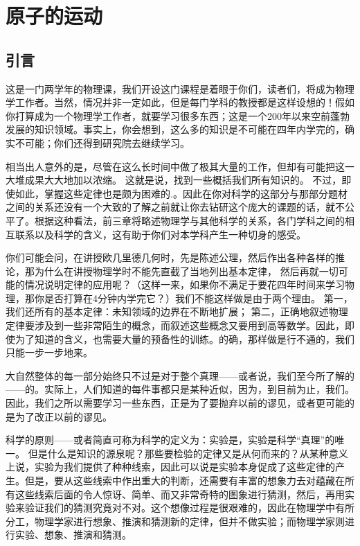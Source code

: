 \chapter{原子的运动}

\section{引言}

这是一门两学年的物理课，我们开设这门课程是着眼于你们，读者们，将成为物理学工作者。当然，情况并非一定如此，但是每门学科的教授都是这样设想的！假如你打算成为一个物理学工作者，就要学习很多东西；这是一个200年以来空前蓬勃发展的知识领域。事实上，你会想到，这么多的知识是不可能在四年内学完的，确实不可能；你们还得到研究院去继续学习。

相当出人意外的是，尽管在这么长时间中做了极其大量的工作，但却有可能把这一大堆成果大大地加以浓缩。 这就是说，找到一些概括我们所有知识的。 不过，即使如此，掌握这些定律也是颇为困难的.。因此在你对科学的这部分与那部分题材之间的关系还没有一个大致的了解之前就让你去钻研这个庞大的课题的话，就不公平了。根据这种看法，前三章将略述物理学与其他科学的关系，各门学科之间的相互联系以及科学的含义，这有助于你们对本学科产生一种切身的感受。

你们可能会问，在讲授欧几里德几何时，先是陈述公理，然后作出各种各样的推论，那为什么在讲授物理学时不能先直截了当地列出基本定律， 然后再就一切可能的情况说明定律的应用呢？（这样一来，如果你不满足于要花四年时间来学习物理，那你是否打算在4分钟内学完它？）我们不能这样做是由于两个理由。 第一，我们还所有的基本定律：未知领域的边界在不断地扩展； 第二，正确地叙述物理定律要涉及到一些非常陌生的概念，而叙述这些概念又要用到高等数学。因此，即使为了知道的含义，也需要大量的预备性的训练。的确，那样做是行不通的，我们只能一步一步地来。

大自然整体的每一部分始终只不过是对于整个真理——或者说，我们至今所了解的——的。实际上，人们知道的每件事都只是某种近似，因为，到目前为止，我们。因此，我们之所以需要学习一些东西，正是为了要抛弃以前的谬见，或者更可能的是为了改正以前的谬见。

科学的原则——或者简直可称为科学的定义为：实验是，实验是科学“真理”的唯一。 但是什么是知识的源泉呢？那些要检验的定律又是从何而来的？从某种意义上说，实验为我们提供了种种线索，因此可以说是实验本身促成了这些定律的产生。但是，要从这些线索中作出重大的判断，还需要有丰富的想象力去对蕴藏在所有这些线索后面的令人惊讶、简单、而又非常奇特的图象进行猜测，然后，再用实验来验证我们的猜测究竟对不对。这个想像过程是很艰难的，因此在物理学中有所分工，物理学家进行想象、推演和猜测新的定律，但并不做实验；而物理学家则进行实验、想象、推演和猜测。

